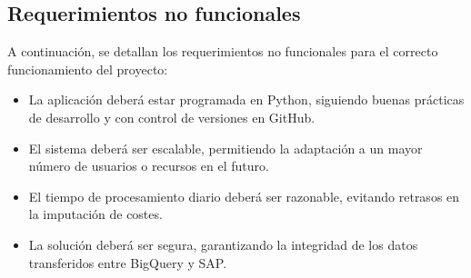 \subsection{Requerimientos no funcionales}
A continuación, se detallan los requerimientos no funcionales para el correcto funcionamiento del proyecto: 
\begin{itemize}
    \item La aplicación deberá estar programada en Python, siguiendo buenas prácticas de desarrollo y con control de versiones en GitHub.
    \item El sistema deberá ser escalable, permitiendo la adaptación a un mayor número de usuarios o recursos en el futuro.
    \item El tiempo de procesamiento diario deberá ser razonable, evitando retrasos en la imputación de costes.
    \item La solución deberá ser segura, garantizando la integridad de los datos transferidos entre BigQuery y SAP.
\end{itemize}
